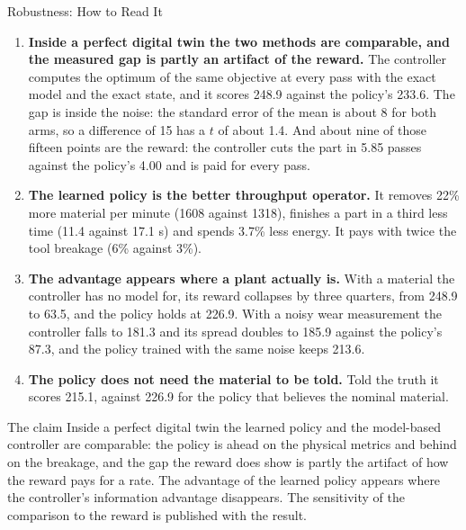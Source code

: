 ﻿\documentclass[11pt,aspectratio=169]{beamer}
\begin{document}
\begin{frame}{Robustness: How to Read It}
    \scriptsize
    \begin{enumerate}
        \item \textbf{Inside a perfect digital twin the two methods are comparable, and the measured
        gap is partly an artifact of the reward.} The controller computes the optimum of the same
        objective at every pass with the exact model and the exact state, and it scores 248.9
        against the policy's 233.6. The gap is inside the noise: the standard error of the mean is
        about 8 for both arms, so a difference of 15 has a $t$ of about 1.4. And about nine of those
        fifteen points are the reward: the controller cuts the part in 5.85 passes against the
        policy's 4.00 and is paid for every pass.
        \item \textbf{The learned policy is the better throughput operator.} It removes \alert{22\% more
        material per minute} (1608 against 1318), finishes a part in \alert{a third less time} (11.4
        against 17.1 s) and spends 3.7\% less energy. It pays with twice the tool breakage (6\% against 3\%).
        \item \textbf{The advantage appears where a plant actually is.} With a material the controller
        has no model for, its reward collapses by three quarters, from 248.9 to 63.5, and the policy
        holds at 226.9. With a noisy wear measurement the controller falls to 181.3 and its spread
        doubles to 185.9 against the policy's 87.3, and the policy trained with the same noise keeps 213.6.
        \item \textbf{The policy does not need the material to be told.} Told the truth it scores 215.1,
        against 226.9 for the policy that believes the nominal material.
    \end{enumerate}

    \vspace{0.1em}
    \begin{alertblock}{The claim}
    \scriptsize
    Inside a perfect digital twin the learned policy and the model-based controller are comparable:
    the policy is ahead on the physical metrics and behind on the breakage, and the gap the reward does
    show is partly the artifact of how the reward pays for a rate. The advantage of the learned policy
    appears where the controller's information advantage disappears. The sensitivity of the comparison
    to the reward is published with the result.
    \end{alertblock}
\end{frame}
\end{document}
